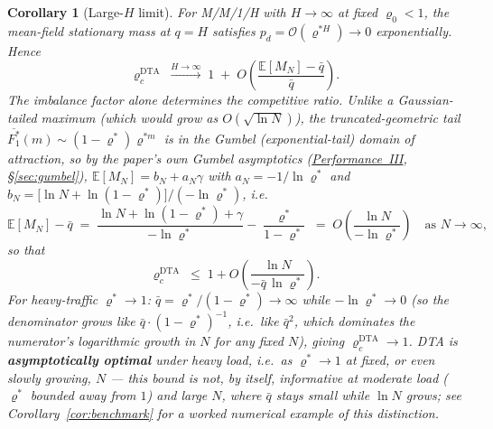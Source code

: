 \documentclass[11pt,a4paper]{report}
\newtheorem{corollary}[theorem]{Corollary}
\begin{document}
\begin{corollary}[Large-$H$ limit]\label{cor:large_H}
For M/M/1/H with $H \to \infty$ at fixed $\varrho_0 < 1$,
the mean-field stationary mass at $q = H$ satisfies
$p_d = \mathcal{O}(\varrho^{*H}) \to 0$ exponentially.  Hence
\[
  \varrho_c^{\mathrm{DTA}} \;\xrightarrow{H\to\infty}\; 1
  \;+\; O\!\left(\frac{\mathbb{E}[M_N] - \bar q}{\bar q}\right).
\]
The imbalance factor alone determines the competitive ratio. Unlike a
Gaussian-tailed maximum (which would grow as $O(\sqrt{\ln N})$), the
truncated-geometric tail $\overline{F_1^*}(m) \sim (1-\varrho^*)\varrho^{*m}$
is in the \emph{Gumbel} (exponential-tail) domain of attraction, so by
the paper's own Gumbel asymptotics
(\hyperref[chap:makespan]{Performance~III}, \S\ref{sec:gumbel}),
$\mathbb{E}[M_N] = b_N + a_N\gamma$ with $a_N = -1/\ln\varrho^*$ and
$b_N = \bigl[\ln N + \ln(1-\varrho^*)\bigr]/(-\ln\varrho^*)$, i.e.
\begin{equation}\label{eq:cr_large_H}
  \mathbb{E}[M_N] - \bar q
  \;=\;
  \frac{\ln N + \ln(1-\varrho^*) + \gamma}{-\ln\varrho^*} - \frac{\varrho^*}{1-\varrho^*}
  \;=\; O\!\left(\frac{\ln N}{-\ln\varrho^*}\right)
  \quad\text{as } N \to \infty,
\end{equation}
so that
\[
  \varrho_c^{\mathrm{DTA}} \;\le\; 1 + O\!\left(\frac{\ln N}{-\bar q\,\ln\varrho^*}\right).
\]
For heavy-traffic $\varrho^* \to 1$: $\bar q = \varrho^*/(1-\varrho^*) \to
\infty$ while $-\ln\varrho^* \to 0$ (so the denominator grows like
$\bar q \cdot (1-\varrho^*)^{-1}$, i.e.\ like $\bar q^2$, which dominates
the numerator's logarithmic growth in $N$ for any fixed $N$), giving
$\varrho_c^{\mathrm{DTA}} \to 1$.  DTA is \textbf{asymptotically optimal}
under heavy load, i.e.\ as $\varrho^* \to 1$ \emph{at fixed, or even slowly
growing, $N$} --- this bound is \emph{not}, by itself, informative at
moderate load ($\varrho^*$ bounded away from $1$) and large $N$, where
$\bar q$ stays small while $\ln N$ grows; see
Corollary~\ref{cor:benchmark} for a worked numerical example of this
distinction.
\end{corollary}
\end{document}
